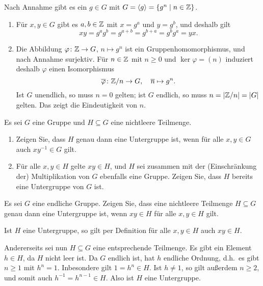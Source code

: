 \begin{solution}
  \label{question: classification of cyclic groups}
  Nach Annahme gibt es ein $g \in G$ mit $G = \langle g\rangle = \{g^n \mid n \in \mathbb{Z}\}$.
  \begin{enumerate}
    \item
      Für $x, y \in G$ gibt es $a, b \in \mathbb{Z}$ mit $x = g^a$ und $y = g^b$, und deshalb gilt
      \[
        xy = g^a g^b = g^{a+b} = g^{b+a} = g^b g^a = yx.
      \]
      
    \item
      Die Abbildung $\varphi \colon \mathbb{Z} \to G$, $n \mapsto g^n$ ist ein Gruppenhomomorphismus, und nach Annahme surjektiv.
      Für $n \in \mathbb{Z}$ mit $n \geq 0$ und $\ker \varphi = (n)$ induziert deshalb $\varphi$ einen Isomorphismus
      \[
        \overline{\varphi} \colon \mathbb{Z}/n \to G,
        \quad
        \overline{n} \mapsto g^n.
      \]
      Ist $G$ unendlich, so muss $n = 0$ gelten;
      ist $G$ endlich, so muss $n = |\mathbb{Z}/n| = |G|$ gelten.
      Das zeigt die Eindeutigkeit von $n$.
  \end{enumerate}
\end{solution}


\begin{question}[subtitle = Zur Definition von Untergruppen]
  Es sei $G$ eine Gruppe und $H \subseteq G$ eine nichtleere Teilmenge.
  \begin{enumerate}
    \item
      Zeigen Sie, dass $H$ genau dann eine Untergruppe ist, wenn für alle $x, y \in G$ auch $x y^{-1} \in G$ gilt.
    \item
      Für alle $x, y \in H$ gelte $xy \in H$, und $H$ sei zusammen mit der (Einschränkung der) Multiplikation von $G$ ebenfalls eine Gruppe.
      Zeigen Sie, dass $H$ bereits eine Untergruppe von $G$ ist.
  \end{enumerate}
\end{question}




\begin{question}[subtitle = Untergruppen von endlichen Gruppen]
  Es sei $G$ eine endliche Gruppe.
  Zeigen Sie, dass eine nichtleere Teilmenge $H \subseteq G$ genau dann eine Untergruppe ist, wenn $xy \in H$ für alle $x,y \in H$ gilt.
\end{question}


\begin{solution}
  Ist $H$ eine Untergruppe, so gilt per Definition für alle $x, y \in H$ auch $xy \in H$.
  
  Andererseits sei nun $H \subseteq G$ eine entsprechende Teilmenge.
  Es gibt ein Element $h \in H$, da $H$ nicht leer ist.
  Da $G$ endlich ist, hat $h$ endliche Ordnung, d.h.\ es gibt $n \geq 1$ mit $h^n = 1$.
  Inbesondere gilt $1 = h^n \in H$.
  Ist $h \neq 1$, so gilt außerdem $n \geq 2$, und somit auch $h^{-1} = h^{n-1} \in H$.
  Also ist $H$ eine Untergruppe.
\end{solution}



